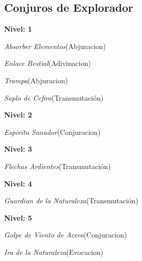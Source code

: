 \documentclass[a4paper,twocolumn,openany,10pt]{dndbook}
\begin{document}
\subsection*{Conjuros de Explorador}
\begin{list}{}{}
	\item \textbf{Nivel: 1}
	\begin{list}{}{}
		\item \textit{Absorber Elementos}(Abjuracion)
		\item \textit{Enlace Bestial}(Adivinacion)
		\item \textit{Trampa}(Abjuracion)
		\item \textit{Soplo de Cefiro}(Transmutación)
	\end{list}

	\item \textbf{Nivel: 2}
	\begin{list}{}{}
		\item \textit{Espiritu Sanador}(Conjuracion)
	\end{list}

	\item \textbf{Nivel: 3}
	\begin{list}{}{}
		\item \textit{Flechas Ardientes}(Transmutación)
	\end{list}

	\item \textbf{Nivel: 4}
	\begin{list}{}{}
		\item \textit{Guardian de la Naturaleza}(Transmutación)
	\end{list}

	\item \textbf{Nivel: 5}
	\begin{list}{}{}
		\item \textit{Golpe de Viento de Acero}(Conjuracion)
		\item \textit{Ira de la Naturaleza}(Evocacion)
	\end{list}

\end{list}
\end{document}
